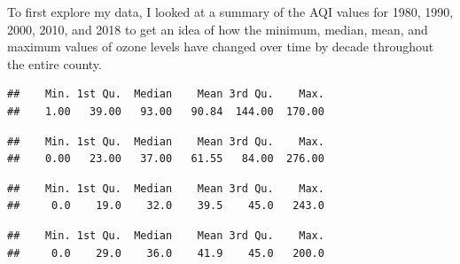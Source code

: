 \documentclass[12pt,]{article}
\newenvironment{Shaded}{\begin{snugshade}}{\end{snugshade}}
\newcommand{\KeywordTok}[1]{\textcolor[rgb]{0.13,0.29,0.53}{\textbf{#1}}}
\newcommand{\DecValTok}[1]{\textcolor[rgb]{0.00,0.00,0.81}{#1}}
\newcommand{\OperatorTok}[1]{\textcolor[rgb]{0.81,0.36,0.00}{\textbf{#1}}}
\newcommand{\NormalTok}[1]{#1}
\begin{document}
To first explore my data, I looked at a summary of the AQI values for
1980, 1990, 2000, 2010, and 2018 to get an idea of how the minimum,
median, mean, and maximum values of ozone levels have changed over time
by decade throughout the entire county.

\begin{Shaded}
\end{Shaded}

\begin{verbatim}
##    Min. 1st Qu.  Median    Mean 3rd Qu.    Max. 
##    1.00   39.00   93.00   90.84  144.00  170.00
\end{verbatim}

\begin{Shaded}
\end{Shaded}

\begin{verbatim}
##    Min. 1st Qu.  Median    Mean 3rd Qu.    Max. 
##    0.00   23.00   37.00   61.55   84.00  276.00
\end{verbatim}

\begin{Shaded}
\end{Shaded}

\begin{verbatim}
##    Min. 1st Qu.  Median    Mean 3rd Qu.    Max. 
##     0.0    19.0    32.0    39.5    45.0   243.0
\end{verbatim}

\begin{Shaded}
\end{Shaded}

\begin{verbatim}
##    Min. 1st Qu.  Median    Mean 3rd Qu.    Max. 
##     0.0    29.0    36.0    41.9    45.0   200.0
\end{verbatim}
\end{document}
